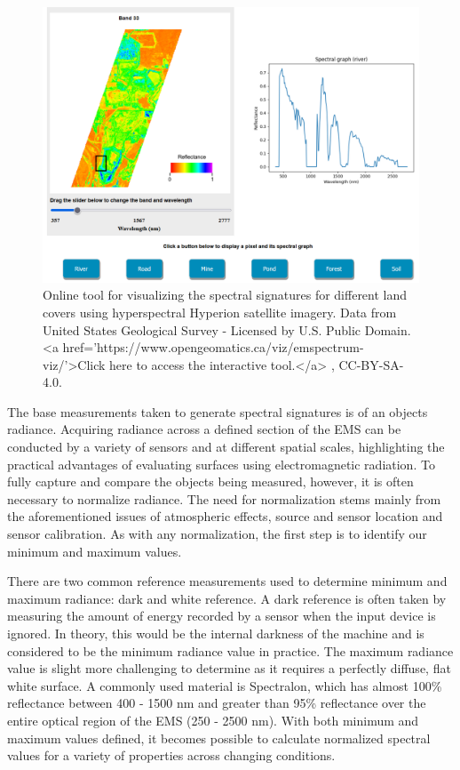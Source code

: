 \documentclass[
]{book}
\begin{document}
\begin{figure}
\includegraphics[width=0.75\linewidth]{images/11-ems-visualization-static} \caption{Online tool for visualizing the spectral signatures for different land covers using hyperspectral Hyperion satellite imagery. Data from United States Geological Survey - Licensed by U.S. Public Domain. <a href='https://www.opengeomatics.ca/viz/emspectrum-viz/'>Click here to access the interactive tool.</a> , CC-BY-SA-4.0.}\label{fig:11-ems-visualization-static}
\end{figure}

The base measurements taken to generate spectral signatures is of an
objects radiance. Acquiring radiance across a defined section of the EMS
can be conducted by a variety of sensors and at different spatial
scales, highlighting the practical advantages of evaluating surfaces
using electromagnetic radiation. To fully capture and compare the objects being measured,
however, it is often necessary to normalize radiance. The need for
normalization stems mainly from the aforementioned issues of atmospheric
effects, source and sensor location and sensor calibration. As with any
normalization, the first step is to identify our minimum and maximum
values.

There are two common reference measurements used to determine minimum
and maximum radiance: dark and white reference. A dark reference is
often taken by measuring the amount of energy recorded by a sensor
when the input device is ignored. In theory, this would be the internal
darkness of the machine and is considered to be the minimum radiance
value in practice. The maximum radiance value is slight more challenging
to determine as it requires a perfectly diffuse, flat white surface. A
commonly used material is Spectralon, which has almost 100\% reflectance
between 400 - 1500 nm and greater than 95\% reflectance over the entire
optical region of the EMS (250 - 2500 nm). With both minimum and maximum
values defined, it becomes possible to calculate normalized spectral
values for a variety of properties across changing conditions.
\end{document}
